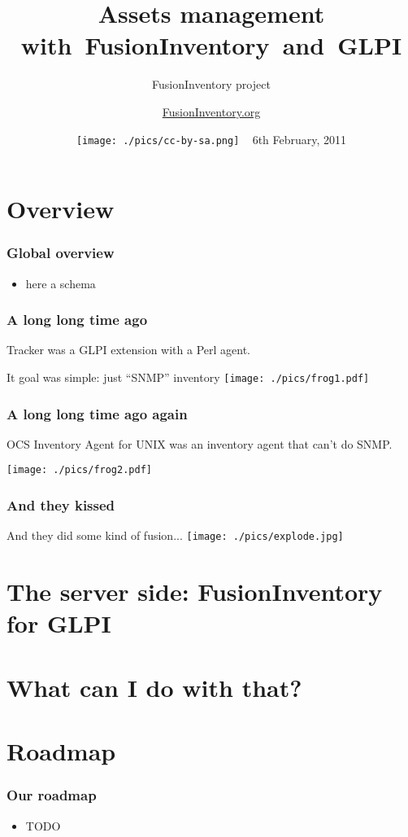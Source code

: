 \documentclass{beamer}
\title{Assets management with~FusionInventory~and~GLPI}
\date{\texttt{[image: ./pics/cc-by-sa.png]} ~ 6th February, 2011}
\institute{\texttt{[image: ./pics/fusioninventory-logo.pdf]}}
\author{ FusionInventory project }
\begin{document}
\frame[plain]{\titlepage}

\author{\href{http://www.FusionInventory.org}{FusionInventory.org}}

\section{Overview}

\begin{frame}
\frametitle{Global overview}

\begin{itemize}
%
\item here a schema
%
\end{itemize}
\end{frame}

\begin{frame}
\frametitle{A long long time ago}
%
Tracker was a GLPI extension with a Perl agent.

It goal was simple: just “SNMP” inventory
\texttt{[image: ./pics/frog1.pdf]}

\end{frame}

\begin{frame}
\frametitle{A long long time ago again}
%
OCS Inventory Agent for UNIX was an inventory agent that can't do SNMP.

\texttt{[image: ./pics/frog2.pdf]}

\end{frame}

\begin{frame}
\frametitle{And they kissed}
%
And they did some kind of fusion...
\texttt{[image: ./pics/explode.jpg]}

\end{frame}


\section{The server side: FusionInventory for GLPI}

\section{What can I do with that?}

\section{Roadmap}
%
\begin{frame}
\frametitle{Our roadmap}
%
\begin{itemize}
%
\item TODO
%
\end{itemize}
\end{frame}
\end{document}
